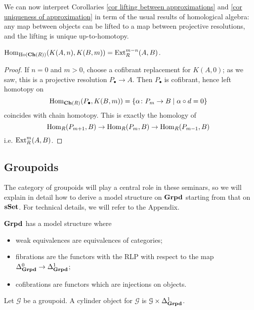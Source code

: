 \begin{refsection}
\begin{rmk}
We can now interpret Corollaries \ref{cor lifting between approximations} and \ref{cor uniqueness of approximation} in term of the usual results of homological algebra: any map between objects can be lifted to a map between projective resolutions, and the lifting is unique up-to-homotopy.
\end{rmk}

\begin{prop}
$\mathrm{Hom}_{\mathrm{Ho}(\mathbf{Ch}(R))}(K(A,n),K(B,m)) = \mathrm{Ext}_R^{m-n}(A,B)$.
\end{prop}

\begin{proof}
If $n = 0$ and $m > 0$, choose a cofibrant replacement for $K(A,0)$; as we saw, this is a projective resolution $P_\bullet \to A$. Then $P_\bullet$ is cofibrant, hence left homotopy on
\[
\mathrm{Hom}_{\mathbf{Ch}(R)}(P_\bullet, K(B,m)) = \{\alpha \colon P_m \to B \mid \alpha \circ d = 0 \}
\]
coincides with chain homotopy. This is exactly the homology of
\[
\mathrm{Hom}_R(P_{m+1},B) \to \mathrm{Hom}_R(P_m,B) \to \mathrm{Hom}_R(P_{m-1},B)
\]
i.e. $\mathrm{Ext}^m_R(A,B)$.
\end{proof}

\subsection{Groupoids} \label{model structure on groupoids}

The category of groupoids will play a central role in these seminars, so we will explain in detail how to derive a model structure on $\mathbf{Grpd}$ starting from that on $\mathbf{s\,\!\mathbf{Set}}$. For technical details, we will refer to the Appendix.

\begin{thm} \label{thm model structure on groupoids}
$\mathbf{Grpd}$ has a model structure where
\begin{itemize}
\item weak equivalences are equivalences of categories;
\item fibrations are the functors with the RLP with respect to the map $\Delta^0_{\mathbf{Grpd}} \to \Delta^1_{\mathbf{Grpd}}$;
\item cofibrations are functors which are injections on objects.
\end{itemize}
\end{thm} %

\begin{prop} \label{prop cylinder for groupoids}
Let $\mathcal G$ be a groupoid. A cylinder object for $\mathcal G$ is $\mathcal G \times \Delta^1_{\mathbf{Grpd}}$.
\end{prop}


\end{refsection}
